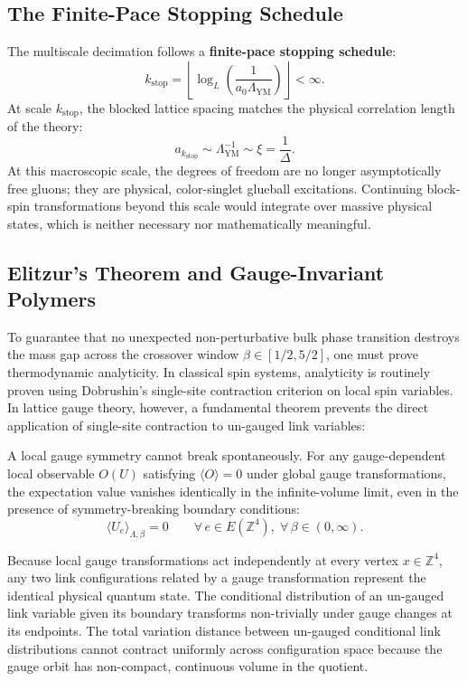 \subsection{The Finite-Pace Stopping Schedule}
\label{subsec:stopping_schedule_ch1}
The multiscale decimation follows a \textbf{finite-pace stopping schedule}:
\begin{equation}
k_{\mathrm{stop}} = \left\lfloor \log_L\left( \frac{1}{a_0 \Lambda_{\mathrm{YM}}} \right) \right\rfloor < \infty.
\end{equation}
At scale $k_{\mathrm{stop}}$, the blocked lattice spacing matches the physical correlation length of the theory:
\begin{equation}
a_{k_{\mathrm{stop}}} \sim \Lambda_{\mathrm{YM}}^{-1} \sim \xi = \frac{1}{\Delta}.
\end{equation}
At this macroscopic scale, the degrees of freedom are no longer asymptotically free gluons; they are physical, color-singlet glueball excitations. Continuing block-spin transformations beyond this scale would integrate over massive physical states, which is neither necessary nor mathematically meaningful.

\subsection{Elitzur's Theorem and Gauge-Invariant Polymers}
\label{subsec:elitzur_polymers_ch1}
To guarantee that no unexpected non-perturbative bulk phase transition destroys the mass gap across the crossover window $\beta \in [1/2, 5/2]$, one must prove thermodynamic analyticity. In classical spin systems, analyticity is routinely proven using Dobrushin's single-site contraction criterion on local spin variables. In lattice gauge theory, however, a fundamental theorem prevents the direct application of single-site contraction to un-gauged link variables:
\begin{theorem}
\label{thm:elitzur_ch1}
A local gauge symmetry cannot break spontaneously. For any gauge-dependent local observable $O(U)$ satisfying $\langle O \rangle = 0$ under global gauge transformations, the expectation value vanishes identically in the infinite-volume limit, even in the presence of symmetry-breaking boundary conditions:
\begin{equation}
\langle U_e \rangle_{\Lambda, \beta} = 0 \qquad \forall \, e \in E(\mathbb{Z}^4), \; \forall \, \beta \in (0, \infty).
\end{equation}
\end{theorem}
Because local gauge transformations act independently at every vertex $x \in \mathbb{Z}^4$, any two link configurations related by a gauge transformation represent the identical physical quantum state. The conditional distribution of an un-gauged link variable given its boundary transforms non-trivially under gauge changes at its endpoints. The total variation distance between un-gauged conditional link distributions cannot contract uniformly across configuration space because the gauge orbit has non-compact, continuous volume in the quotient.

